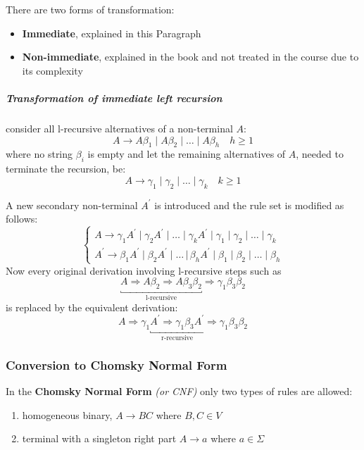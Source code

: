 \documentclass[english]{article}
\begin{document}
There are two forms of transformation:
\begin{itemize}
  \item \textbf{Immediate}, explained in this Paragraph
  \item \textbf{Non-immediate}, explained in the book and not treated in the course due to its complexity
\end{itemize}

\subparagraph*{Transformation of immediate left recursion}

consider all l-recursive alternatives of a non-terminal \(A\):
\[ A \rightarrow A \beta_1 \mid A \beta_2 \mid \ldots \mid A \beta_h \quad h \geq 1 \]
where no string \(\beta_i\) is empty and let the remaining alternatives of \(A\), needed to terminate the recursion, be:
\[ A \rightarrow \gamma_1 \mid \gamma_2 \mid \ldots \mid \gamma_k \quad k \geq 1 \]

A new secondary non-terminal \(A^\prime\) is introduced and the rule set is modified as follows:
\[\begin{cases}
    A \rightarrow \gamma_1 A^\prime \mid \gamma_2 A^\prime \mid \ldots \mid \gamma_k A^\prime \mid \gamma_1 \mid \gamma_2 \mid \ldots \mid \gamma_k \\
    A^\prime \rightarrow \beta_1 A^\prime \mid \beta_2 A^\prime \mid \ldots \, |\, \beta_h A^\prime \mid \beta_1 \mid \beta_2 \mid \ldots \mid \beta_h
  \end{cases}\]
Now every original derivation involving l-recursive steps such as
\[\underbracket{A \Rightarrow A \beta_2 \Rightarrow A \beta_3 \beta_2}_{\text{l-recursive}} \Rightarrow \gamma_1 \beta_3 \beta_2 \]
is replaced by the equivalent derivation:
\[A \Rightarrow \gamma_1 \underbracket{A^\prime \Rightarrow \gamma_1 \beta_3 A^\prime}_{\text{r-recursive}} \Rightarrow \gamma_1 \beta_3 \beta_2 \]

\subsubsection{Conversion to Chomsky Normal Form}
\label{sec:conversion-to-chomsky-normal-form}

In the \textbf{Chomsky Normal Form} \textit{(or CNF)} only two types of rules are allowed:

\begin{enumerate}
  \item homogeneous binary, \(A \rightarrow BC\) where \(B, C \in V\)
  \item terminal with a singleton right part \(A \rightarrow a\) where \(a \in \Sigma\)
\end{enumerate}
\end{document}
